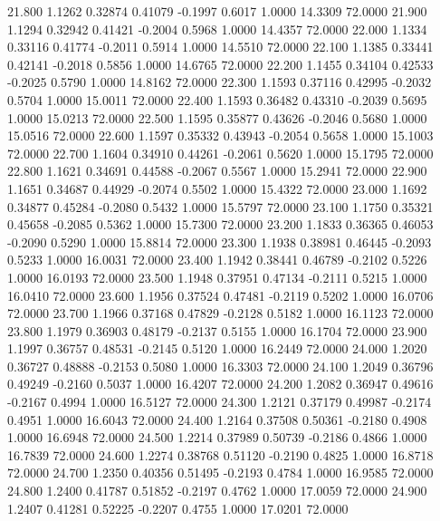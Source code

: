   21.800   1.1262   0.32874   0.41079  -0.1997   0.6017   1.0000  14.3309  72.0000
  21.900   1.1294   0.32942   0.41421  -0.2004   0.5968   1.0000  14.4357  72.0000
  22.000   1.1334   0.33116   0.41774  -0.2011   0.5914   1.0000  14.5510  72.0000
  22.100   1.1385   0.33441   0.42141  -0.2018   0.5856   1.0000  14.6765  72.0000
  22.200   1.1455   0.34104   0.42533  -0.2025   0.5790   1.0000  14.8162  72.0000
  22.300   1.1593   0.37116   0.42995  -0.2032   0.5704   1.0000  15.0011  72.0000
  22.400   1.1593   0.36482   0.43310  -0.2039   0.5695   1.0000  15.0213  72.0000
  22.500   1.1595   0.35877   0.43626  -0.2046   0.5680   1.0000  15.0516  72.0000
  22.600   1.1597   0.35332   0.43943  -0.2054   0.5658   1.0000  15.1003  72.0000
  22.700   1.1604   0.34910   0.44261  -0.2061   0.5620   1.0000  15.1795  72.0000
  22.800   1.1621   0.34691   0.44588  -0.2067   0.5567   1.0000  15.2941  72.0000
  22.900   1.1651   0.34687   0.44929  -0.2074   0.5502   1.0000  15.4322  72.0000
  23.000   1.1692   0.34877   0.45284  -0.2080   0.5432   1.0000  15.5797  72.0000
  23.100   1.1750   0.35321   0.45658  -0.2085   0.5362   1.0000  15.7300  72.0000
  23.200   1.1833   0.36365   0.46053  -0.2090   0.5290   1.0000  15.8814  72.0000
  23.300   1.1938   0.38981   0.46445  -0.2093   0.5233   1.0000  16.0031  72.0000
  23.400   1.1942   0.38441   0.46789  -0.2102   0.5226   1.0000  16.0193  72.0000
  23.500   1.1948   0.37951   0.47134  -0.2111   0.5215   1.0000  16.0410  72.0000
  23.600   1.1956   0.37524   0.47481  -0.2119   0.5202   1.0000  16.0706  72.0000
  23.700   1.1966   0.37168   0.47829  -0.2128   0.5182   1.0000  16.1123  72.0000
  23.800   1.1979   0.36903   0.48179  -0.2137   0.5155   1.0000  16.1704  72.0000
  23.900   1.1997   0.36757   0.48531  -0.2145   0.5120   1.0000  16.2449  72.0000
  24.000   1.2020   0.36727   0.48888  -0.2153   0.5080   1.0000  16.3303  72.0000
  24.100   1.2049   0.36796   0.49249  -0.2160   0.5037   1.0000  16.4207  72.0000
  24.200   1.2082   0.36947   0.49616  -0.2167   0.4994   1.0000  16.5127  72.0000
  24.300   1.2121   0.37179   0.49987  -0.2174   0.4951   1.0000  16.6043  72.0000
  24.400   1.2164   0.37508   0.50361  -0.2180   0.4908   1.0000  16.6948  72.0000
  24.500   1.2214   0.37989   0.50739  -0.2186   0.4866   1.0000  16.7839  72.0000
  24.600   1.2274   0.38768   0.51120  -0.2190   0.4825   1.0000  16.8718  72.0000
  24.700   1.2350   0.40356   0.51495  -0.2193   0.4784   1.0000  16.9585  72.0000
  24.800   1.2400   0.41787   0.51852  -0.2197   0.4762   1.0000  17.0059  72.0000
  24.900   1.2407   0.41281   0.52225  -0.2207   0.4755   1.0000  17.0201  72.0000
